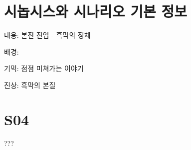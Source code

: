 \documentclass{report}
\begin{document}
	\section{시놉시스와 시나리오 기본 정보}
		내용: 본진 진입 - 흑막의 정체
		
		배경: 
		
		기믹: 점점 미쳐가는 이야기
		
		진상: 흑막의 본질
	
	\section{S04}
		???
\end{document}
